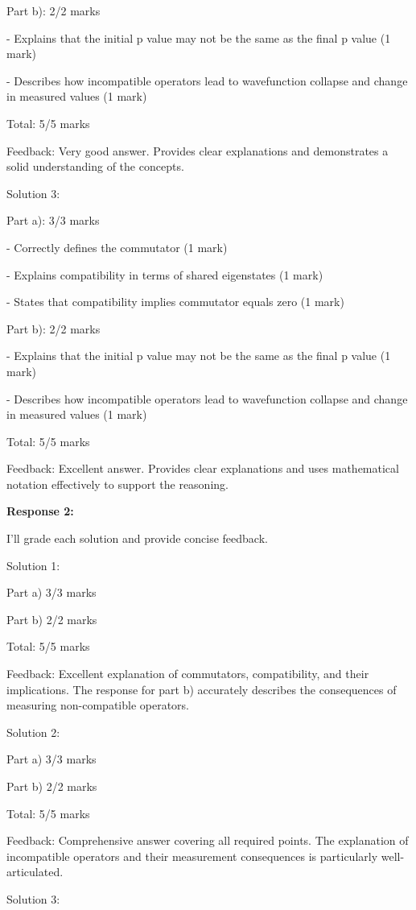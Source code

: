 \documentclass[a4paper,11pt]{article}
\begin{document}
Part b): 2/2 marks

- Explains that the initial p value may not be the same as the final p value (1 mark)

- Describes how incompatible operators lead to wavefunction collapse and change in measured values (1 mark)

Total: 5/5 marks

Feedback: Very good answer. Provides clear explanations and demonstrates a solid understanding of the concepts.

Solution 3:

Part a): 3/3 marks

- Correctly defines the commutator (1 mark)

- Explains compatibility in terms of shared eigenstates (1 mark)

- States that compatibility implies commutator equals zero (1 mark)

Part b): 2/2 marks

- Explains that the initial p value may not be the same as the final p value (1 mark)

- Describes how incompatible operators lead to wavefunction collapse and change in measured values (1 mark)

Total: 5/5 marks

Feedback: Excellent answer. Provides clear explanations and uses mathematical notation effectively to support the reasoning.

\bigskip   
\textbf{Response 2:}

I'll grade each solution and provide concise feedback.

Solution 1:

Part a) 3/3 marks

Part b) 2/2 marks

Total: 5/5 marks

Feedback: Excellent explanation of commutators, compatibility, and their implications. The response for part b) accurately describes the consequences of measuring non-compatible operators.

Solution 2:

Part a) 3/3 marks

Part b) 2/2 marks

Total: 5/5 marks

Feedback: Comprehensive answer covering all required points. The explanation of incompatible operators and their measurement consequences is particularly well-articulated.

Solution 3:
\end{document}

